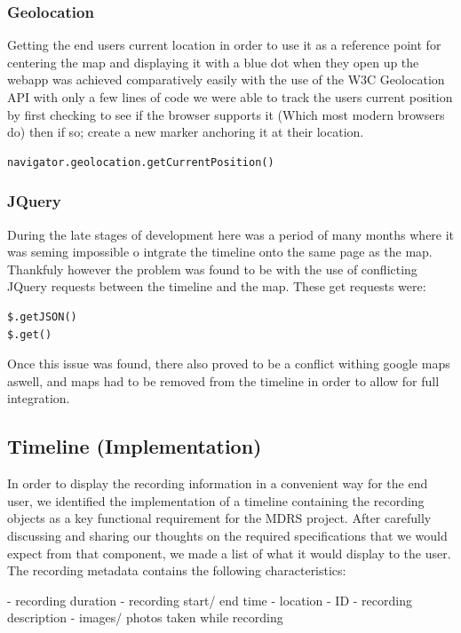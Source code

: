\documentclass{l3proj}
\begin{document}
\subsubsection{Geolocation}

Getting the end users current location in order to use it as a
reference point for centering the map and displaying it with a blue
dot when they open up the webapp was achieved comparatively easily
with the use of the W3C Geolocation API with only a few lines of code
we were able to track the users current position by first checking to
see if the browser supports it (Which most modern browsers do) then if
so; create a new marker anchoring it at their location.
\begin{verbatim}
navigator.geolocation.getCurrentPosition()
\end{verbatim}

\subsubsection{JQuery} 

During the late stages of development here was a period of many months
where it was seming impossible o intgrate the timeline onto the same
page as the map. Thankfuly however the problem was found to be with the
use of conflicting JQuery requests between the timeline and the
map. These get requests were:
\begin{verbatim}
$.getJSON()
$.get()
\end{verbatim}
Once this issue was found, there also proved to be a conflict withing
google maps aswell, and maps had to be removed from the timeline in
order to allow for full integration.


\subsection{Timeline (Implementation)}

In order to display the recording information in a convenient way for the end user, we identified the implementation of a timeline containing the recording objects as a key functional requirement for the MDRS project. After carefully discussing and sharing our thoughts on the required specifications that we would expect from that component, we made a list of what it would display to the user. The recording metadata contains the following characteristics:

- recording duration
- recording start/ end time
- location
- ID
- recording description
- images/ photos taken while recording
\end{document}
